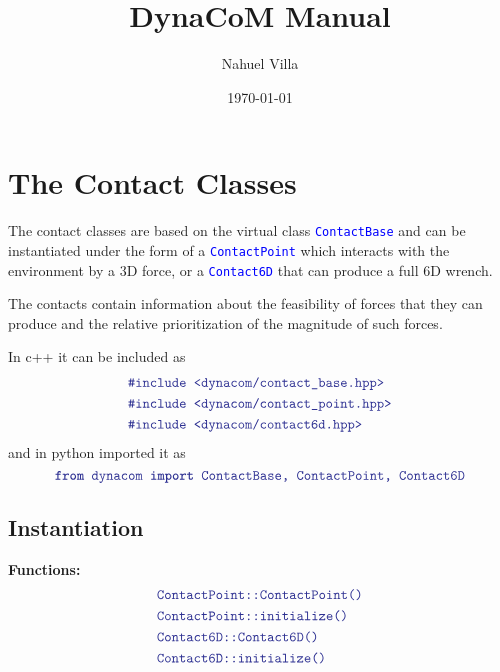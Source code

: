 \documentclass[12pt]{article}
\title{DynaCoM Manual}
\author{Nahuel Villa}
\date{\today}
\newcommand{\code}[2][Blue]{\textcolor{#1}{\texttt{#2}}}
\newcommand{\codebf}[2][Blue]{\textcolor{#1}{\texttt{\textbf{#2}}}}
\begin{document}
\maketitle{}

\tableofcontents

\clearpage
\newpage

\section{The Contact Classes}

The contact classes are based on the virtual class \code{ContactBase} and can be instantiated under the form of a \code{ContactPoint} which interacts with the environment by a $3$D force, or a \code{Contact6D} that can produce a full $6$D wrench.

The contacts contain information about the feasibility of forces that they can produce and the relative prioritization of the magnitude of such forces.

    In c++ it can be included as
    \begin{align*}
    &\code{\#include <dynacom/contact\_base.hpp>}\\
    &\code{\#include <dynacom/contact\_point.hpp>}\\
    &\code{\#include <dynacom/contact6d.hpp>}
    \end{align*}
    and in python imported it as
    \begin{equation*}
    \codebf{from }\code{dynacom }\codebf{import }\code{ContactBase, ContactPoint, Contact6D}
    \end{equation*}

\subsection{Instantiation}
\hrulefill

{\bf Functions:}
    \begin{align*}
        &\code{ContactPoint::ContactPoint()}\\
        &\code{ContactPoint::initialize()}\\
        &\code{Contact6D::Contact6D()}\\
        &\code{Contact6D::initialize()}
    \end{align*}
\end{document}
